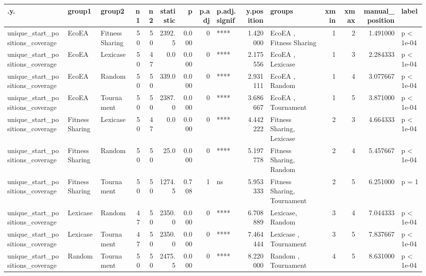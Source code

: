\documentclass[]{book}
\begin{document}
\begin{table}
\centering
\begin{tabular}[t]{l|l|l|r|r|r|r|r|l|r|l|r|r|r|l}
\hline
.y. & group1 & group2 & n1 & n2 & statistic & p & p.adj & p.adj.signif & y.position & groups & xmin & xmax & manual\_position & label\\
\hline
unique\_start\_positions\_coverage & EcoEA & Fitness Sharing & 50 & 50 & 2392.5 & 0.000 & 0 & **** & 1.420000 & EcoEA          , Fitness Sharing & 1 & 2 & 1.491000 & p < 1e-04\\
\hline
unique\_start\_positions\_coverage & EcoEA & Lexicase & 50 & 47 & 0.0 & 0.000 & 0 & **** & 2.175556 & EcoEA   , Lexicase & 1 & 3 & 2.284333 & p < 1e-04\\
\hline
unique\_start\_positions\_coverage & EcoEA & Random & 50 & 50 & 339.0 & 0.000 & 0 & **** & 2.931111 & EcoEA , Random & 1 & 4 & 3.077667 & p < 1e-04\\
\hline
unique\_start\_positions\_coverage & EcoEA & Tournament & 50 & 50 & 2387.0 & 0.000 & 0 & **** & 3.686667 & EcoEA     , Tournament & 1 & 5 & 3.871000 & p < 1e-04\\
\hline
unique\_start\_positions\_coverage & Fitness Sharing & Lexicase & 50 & 47 & 0.0 & 0.000 & 0 & **** & 4.442222 & Fitness Sharing, Lexicase & 2 & 3 & 4.664333 & p < 1e-04\\
\hline
unique\_start\_positions\_coverage & Fitness Sharing & Random & 50 & 50 & 25.0 & 0.000 & 0 & **** & 5.197778 & Fitness Sharing, Random & 2 & 4 & 5.457667 & p < 1e-04\\
\hline
unique\_start\_positions\_coverage & Fitness Sharing & Tournament & 50 & 50 & 1274.5 & 0.708 & 1 & ns & 5.953333 & Fitness Sharing, Tournament & 2 & 5 & 6.251000 & p = 1\\
\hline
unique\_start\_positions\_coverage & Lexicase & Random & 47 & 50 & 2350.0 & 0.000 & 0 & **** & 6.708889 & Lexicase, Random & 3 & 4 & 7.044333 & p < 1e-04\\
\hline
unique\_start\_positions\_coverage & Lexicase & Tournament & 47 & 50 & 2350.0 & 0.000 & 0 & **** & 7.464444 & Lexicase  , Tournament & 3 & 5 & 7.837667 & p < 1e-04\\
\hline
unique\_start\_positions\_coverage & Random & Tournament & 50 & 50 & 2475.5 & 0.000 & 0 & **** & 8.220000 & Random    , Tournament & 4 & 5 & 8.631000 & p < 1e-04\\
\hline
\end{tabular}
\end{table}
\end{document}
